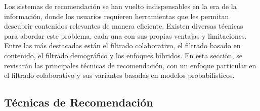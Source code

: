 \documentclass[twocolumn, fontsize=10pt]{article}
\begin{document}
Los sistemas de recomendación se han vuelto 
indispensables en la era de la información, 
donde los usuarios requieren herramientas que les 
permitan descubrir contenidos relevantes de manera 
eficiente. Existen diversas técnicas para abordar 
este problema, cada una con sus propias ventajas y 
limitaciones. Entre las más destacadas están el 
filtrado colaborativo, el filtrado basado en contenido, 
el filtrado demográfico y los enfoques híbridos. 
En esta sección, se revisarán las principales técnicas 
de recomendación, con un enfoque particular en el 
filtrado colaborativo y sus variantes basadas en 
modelos probabilísticos.

\subsection{Técnicas de Recomendación}
\end{document}

